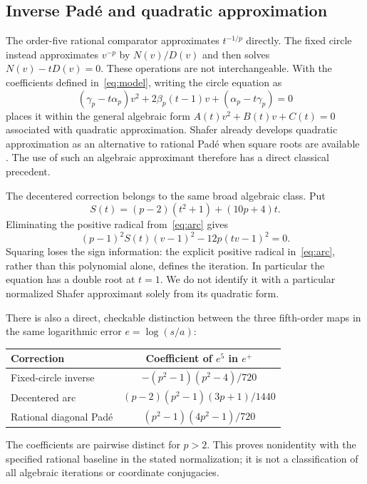 \documentclass[11pt,a4paper]{article}
\begin{document}
\clearpage
\subsection{Inverse Pad\'e and quadratic approximation}\label{sec:quadraticprior}
The order-five rational comparator approximates $t^{-1/p}$ directly. The fixed circle instead approximates $v^{-p}$ by $N(v)/D(v)$ and then solves $N(v)-tD(v)=0$. These operations are not interchangeable. With the coefficients defined in~\eqref{eq:model}, writing the circle equation as
\[
 (\gamma_p-t\alpha_p)v^2+2\beta_p(t-1)v+(\alpha_p-t\gamma_p)=0
\]
places it within the general algebraic form $A(t)v^2+B(t)v+C(t)=0$ associated with quadratic approximation. Shafer already develops quadratic approximation as an alternative to rational Pad\'e when square roots are available \cite{shafer1974}. The use of such an algebraic approximant therefore has a direct classical precedent.

The decentered correction belongs to the same broad algebraic class. Put
\[
 S(t)=(p-2)(t^2+1)+(10p+4)t.
\]
Eliminating the positive radical from~\eqref{eq:arc} gives
\begin{equation}\label{eq:arcimplicit}
 (p-1)^2 S(t)(v-1)^2-12p(tv-1)^2=0.
\end{equation}
Squaring loses the sign information: the explicit positive radical in~\eqref{eq:arc}, rather than this polynomial alone, defines the iteration. In particular the equation has a double root at $t=1$. We do not identify it with a particular normalized Shafer approximant solely from its quadratic form.

There is also a direct, checkable distinction between the three fifth-order maps in the same logarithmic error $e=\log(s/a)$:
\begin{center}\small
\begin{tabular}{@{}lc@{}}\toprule
Correction & Coefficient of $e^5$ in $e^+$\\\midrule
Fixed-circle inverse & $-(p^2-1)(p^2-4)/720$\\
Decentered arc & $(p-2)(p^2-1)(3p+1)/1440$\\
Rational diagonal Pad\'e & $(p^2-1)(4p^2-1)/720$\\\bottomrule
\end{tabular}
\end{center}
The coefficients are pairwise distinct for $p>2$. This proves nonidentity with the specified rational baseline in the stated normalization; it is not a classification of all algebraic iterations or coordinate conjugacies.
\end{document}
